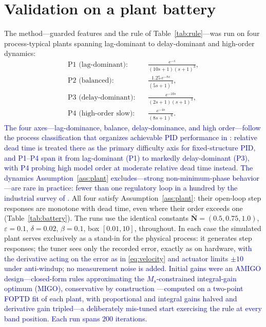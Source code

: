 \documentclass[final,3p,times,twocolumn]{elsarticle}
\newcommand{\reve}[1]{\textcolor{blue}{#1}} %
\newcommand{\revf}[1]{\textcolor{blue}{#1}} %
\newcommand{\revg}[1]{\textcolor{blue}{#1}} %
\newcommand{\revh}[1]{\textcolor{blue}{#1}} %
\begin{document}
\section{Validation on a plant battery}
\label{sec:battery}

The method---guarded features and the rule of
Table~\ref{tab:rule}---was run on four process-typical plants spanning lag-dominant to
delay-dominant and high-order dynamics:
\begin{align*}
\text{P1 (lag-dominant):} &\quad \tfrac{e^{-s}}{(10s+1)(s+1)^3}, \\
\text{P2 (balanced):} &\quad \tfrac{1.25\,e^{-8s}}{(5s+1)^4}, \\
\text{P3 (delay-dominant):} &\quad \tfrac{e^{-10s}}{(2s+1)(s+1)^3}, \\
\text{P4 (high-order slow):} &\quad \tfrac{e^{-4s}}{(8s+1)^6}.
\end{align*}
\revg{The four axes---lag-dominance, balance, delay-dominance, and
high order---follow the process classification that organizes
achievable PID performance in \cite{AstromHagglund2004}: relative dead
time is treated there as the primary difficulty axis for
fixed-structure PID, and P1--P4 span it from lag-dominant (P1) to
markedly delay-dominant (P3), with P4 probing high model order at
\revh{moderate relative} dead time instead. The dynamics
Assumption~\ref{ass:plant} excludes---strong non-minimum-phase
behavior---are rare in practice: fewer than one regulatory loop in a
hundred by the industrial survey of \cite{Desborough2002}.}
All four satisfy
Assumption~\ref{ass:plant}: their open-loop step responses are monotone
with dead time, even where their order exceeds one (Table~\ref{tab:battery}). The runs use the
identical constants
$\bar{\mathbf N} = (0.5, 0.75, 1.0)$, $\varepsilon = 0.1$,
$\delta = 0.02$, $\beta = 0.1$, box $[0.01, 10]$, throughout. In each
case the simulated plant serves exclusively as a stand-in for the physical
process: it generates step responses; the tuner sees only the recorded
error, exactly as on hardware\reve{, with the derivative acting on
the error as in \eqref{eq:velocity} and actuator limits $\pm 10$ under
anti-windup; no measurement noise is added. Initial gains were an
AMIGO design\revf{---closed-form rules approximating the
$M_s$-constrained integral-gain optimum (MIGO), conservative by
construction \cite{AstromHagglund2004}}---computed on a two-point FOPTD
fit of each plant, with proportional and integral gains halved and
derivative gain tripled---a deliberately mis-tuned start exercising
the rule at every band position. Each run spans $200$ iterations.}
\end{document}

